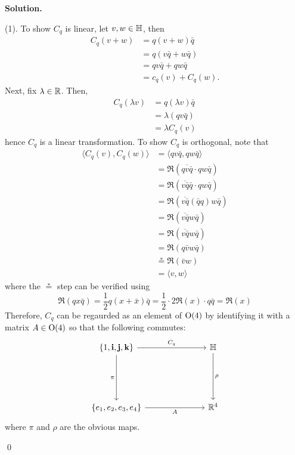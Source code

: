\documentclass[12pt]{book}
\theoremstyle{definition}
\newenvironment{solution}
{%
  \par\noindent\textbf{Solution.}\quad
}
{%
  \qed\par
}
\begin{document}
\begin{solution}
  (1). To show $C_q$ is linear, let $v, w \in \mathbb{H}$, then
  \[\begin{aligned}
    C_q(v + w) &= q(v+w)\bar{q} \\
               &= q(v\bar{q} + w\bar{q}) \\
               &= qv\bar{q} + qw\bar{q} \\
               &= c_q(v) + C_q(w).
  \end{aligned}\]
  Next, fix $\lambda \in \mathbb{R}$. Then,
  \[
  \begin{aligned}
    C_q(\lambda v) &= q(\lambda v)\bar{q} \\
                   &= \lambda(qv\bar{q}) \\
                   &= \lambda C_q(v)
  \end{aligned}
  \]    
  hence $C_q$ is a linear transformation.
  To show $C_q$ is orthogonal, note that
  \[
  \begin{aligned}
    \langle C_q(v), C_q(w) \rangle &= \langle qv\bar{q}, qw\bar{q} \rangle \\
                                   &= \Re(\overline{qv\bar{q}} \cdot qw\bar{q}) \\
                                   &= \Re(\overline{v\bar{q}}\bar{q} \cdot qw\bar{q}) \\
                                   &= \Re(\overline{v\bar{q}}(\bar{q}q)w\bar{q}) \\
                                   &= \Re(\overline{v\bar{q}}w\bar{q}) \\
                                   &= \Re(\overline{v\bar{q}}w\bar{q}) \\
                                   &= \Re(q\bar{v}w \bar{q}) \\
                                   &\stackrel{*}{=} \Re(\bar{v}w) \\
                                   &= \langle v, w\rangle 
  \end{aligned}
  \]
  where the $\stackrel{*}{=}$ step can be verified using
  \[\Re(qx \bar{q})= \frac{1}{2} q(x + \bar{x})\bar{q} = \frac{1}{2}\cdot 2\Re(x) \cdot q\bar{q} = \Re(x)\] 
  Therefore, $C_q$ can be regaurded as an element of $\mathrm{O}(4)$ by identifying it with a matrix $A \in \mathrm{O}(4)$ so that the following commutes:
  \[\begin{tikzcd}
    {\{1, \mathbf{i}, \mathbf{j}, \mathbf{k}\}} &&& \HH \\
    \\
    \\
    {\{e_1, e_2, e_3, e_4\}} &&& {\R^4}
    \arrow["{C_q}", from=1-1, to=1-4]
    \arrow["\pi"', from=1-1, to=4-1]
    \arrow["{A}"', from=4-1, to=4-4]
    \arrow["\rho", from=1-4, to=4-4]
  \end{tikzcd}\]
  where $\pi$ and $\rho$ are the obvious maps.


\end{solution}
\end{document}
